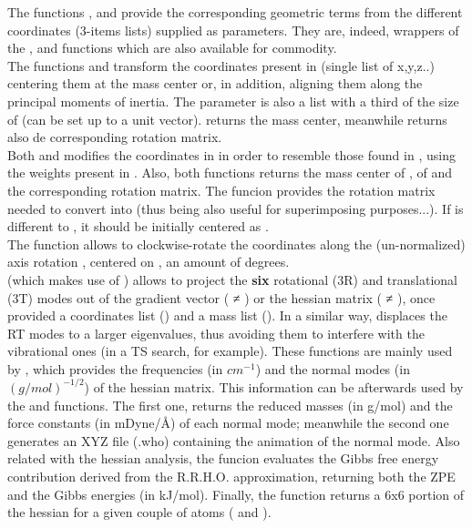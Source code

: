 The functions ,  and  provide the corresponding geometric
terms from the different coordinates (3-items lists) supplied as parameters. They are, indeed, wrappers
of the ,  and  functions which are also available 
for commodity.\\
The functions  and  transform the coordinates present in 
(single list of x,y,z..) centering them at the mass center or, in addition, aligning them along the principal moments of inertia. The
 parameter is also a list with a third of the size of  (can be set up to a unit vector).
 returns the mass center, meanwhile  returns also de corresponding rotation matrix.\\
Both  and  modifies the coordinates in  in order to resemble those found in , using the weights present in . Also, both functions returns the mass center of , of  and the corresponding rotation matrix. The funcion  provides the rotation matrix needed to convert  into  (thus being also useful for superimposing purposes...). If  is different to , it should be initially centered as .\\
The function  allows to clockwise-rotate the coordinates  along the (un-normalized) axis rotation , centered on , an amount of  degrees.\\
 (which makes use of ) allows to project the \textbf{six} rotational (3R) and translational (3T) modes out
of the gradient vector ( ≠ ) or the hessian matrix ( ≠ ), once provided a coordinates list () and a mass list (). In a similar way,  displaces the RT modes to a larger eigenvalues, thus avoiding them to interfere with the vibrational ones (in a TS search, for example). These functions are mainly used by , which provides the frequencies (in $cm^{-1}$) and the normal modes (in $(g/mol)^{-1/2}$) of the hessian matrix. This information can be afterwards used by the  and  functions. The first one, returns the reduced masses (in g/mol) and the force constants (in mDyne/Å) of each normal mode; meanwhile the second one generates an XYZ file (.who) containing the animation of the normal mode. Also related with the hessian analysis, the funcion  evaluates the Gibbs free energy contribution derived from the R.R.H.O. approximation, returning both the ZPE and the Gibbs energies (in kJ/mol). Finally, the  function returns a 6x6 portion of the hessian for a given couple of atoms ( and ).\\
